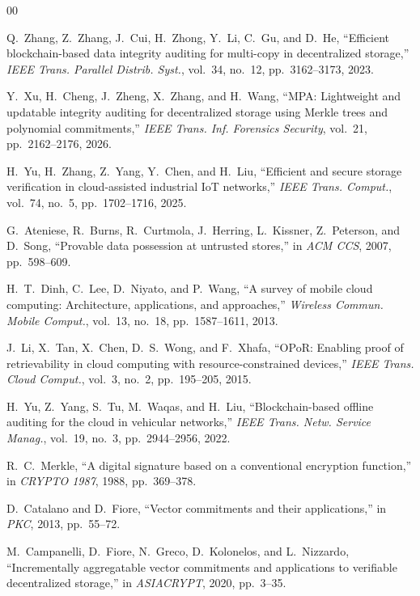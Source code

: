 \documentclass[lettersize,journal]{IEEEtran}
\begin{document}
\begin{thebibliography}{00}

Q.~Zhang, Z.~Zhang, J.~Cui, H.~Zhong, Y.~Li, C.~Gu, and D.~He,
``Efficient blockchain-based data integrity auditing for multi-copy in decentralized storage,''
\emph{IEEE Trans. Parallel Distrib. Syst.}, vol.~34, no.~12, pp.~3162--3173, 2023.

Y.~Xu, H.~Cheng, J.~Zheng, X.~Zhang, and H.~Wang,
``MPA: Lightweight and updatable integrity auditing for decentralized storage using Merkle trees and polynomial commitments,''
\emph{IEEE Trans. Inf. Forensics Security}, vol.~21, pp.~2162--2176, 2026.

H.~Yu, H.~Zhang, Z.~Yang, Y.~Chen, and H.~Liu,
``Efficient and secure storage verification in cloud-assisted industrial IoT networks,''
\emph{IEEE Trans. Comput.}, vol.~74, no.~5, pp.~1702--1716, 2025.

G.~Ateniese, R.~Burns, R.~Curtmola, J.~Herring, L.~Kissner, Z.~Peterson, and D.~Song,
``Provable data possession at untrusted stores,''
in \emph{ACM CCS}, 2007, pp.~598--609.

H.~T.~Dinh, C.~Lee, D.~Niyato, and P.~Wang,
``A survey of mobile cloud computing: Architecture, applications, and approaches,''
\emph{Wireless Commun. Mobile Comput.}, vol.~13, no.~18, pp.~1587--1611, 2013.

J.~Li, X.~Tan, X.~Chen, D.~S.~Wong, and F.~Xhafa,
``OPoR: Enabling proof of retrievability in cloud computing with resource-constrained devices,''
\emph{IEEE Trans. Cloud Comput.}, vol.~3, no.~2, pp.~195--205, 2015.

H.~Yu, Z.~Yang, S.~Tu, M.~Waqas, and H.~Liu,
``Blockchain-based offline auditing for the cloud in vehicular networks,''
\emph{IEEE Trans. Netw. Service Manag.}, vol.~19, no.~3, pp.~2944--2956, 2022.

R.~C.~Merkle,
``A digital signature based on a conventional encryption function,''
in \emph{CRYPTO 1987}, 1988, pp.~369--378.

D.~Catalano and D.~Fiore,
``Vector commitments and their applications,''
in \emph{PKC}, 2013, pp.~55--72.

M.~Campanelli, D.~Fiore, N.~Greco, D.~Kolonelos, and L.~Nizzardo,
``Incrementally aggregatable vector commitments and applications to verifiable decentralized storage,''
in \emph{ASIACRYPT}, 2020, pp.~3--35.


\end{thebibliography}
\end{document}
